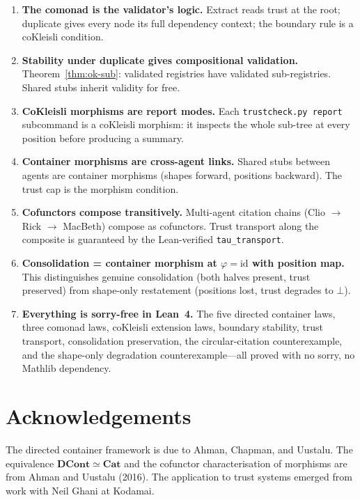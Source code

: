 \documentclass[11pt,a4paper]{article}
\theoremstyle{definition}
\theoremstyle{plain}
\theoremstyle{remark}
\newcommand{\DCont}{\mathbf{DCont}}
\newcommand{\Cat}{\mathbf{Cat}}
\begin{document}
\begin{enumerate}
\item \textbf{The comonad is the validator's logic.} Extract reads trust
  at the root; duplicate gives every node its full dependency context;
  the boundary rule is a coKleisli condition.

\item \textbf{Stability under duplicate gives compositional
  validation.} Theorem~\ref{thm:ok-sub}: validated registries have
  validated sub-registries. Shared stubs inherit validity for free.

\item \textbf{CoKleisli morphisms are report modes.} Each
  \texttt{trustcheck.py report} subcommand is a coKleisli morphism:
  it inspects the whole sub-tree at every position before producing
  a summary.

\item \textbf{Container morphisms are cross-agent links.} Shared
  stubs between agents are container morphisms (shapes forward,
  positions backward). The trust cap is the morphism condition.

\item \textbf{Cofunctors compose transitively.} Multi-agent citation
  chains (Clio $\to$ Rick $\to$ MacBeth) compose as cofunctors.
  Trust transport along the composite is guaranteed by the Lean-verified
  \texttt{tau\_transport}.

\item \textbf{Consolidation = container morphism at $\varphi = \mathrm{id}$
  with position map.} This distinguishes genuine consolidation (both
  halves present, trust preserved) from shape-only restatement
  (positions lost, trust degrades to $\bot$).

\item \textbf{Everything is sorry-free in Lean~4.} The five directed
  container laws, three comonad laws, coKleisli extension laws,
  boundary stability, trust transport, consolidation preservation,
  the circular-citation counterexample, and the shape-only degradation
  counterexample---all proved with no sorry, no Mathlib dependency.
\end{enumerate}

\section*{Acknowledgements}

The directed container framework is due to Ahman, Chapman, and
Uustalu. The equivalence $\DCont \simeq \Cat$ and the cofunctor
characterisation of morphisms are from Ahman and Uustalu (2016). The
application to trust systems emerged from work with Neil Ghani at
Kodamai.
\end{document}
